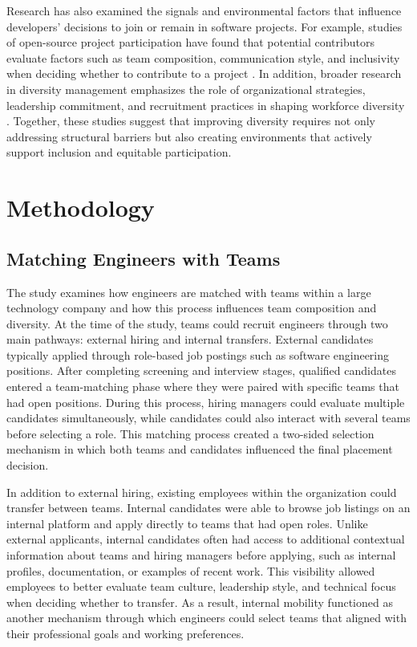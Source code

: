Research has also examined the signals and environmental factors that influence developers' decisions to join or remain in software projects. For example, studies of open-source project participation have found that potential contributors evaluate factors such as team composition, communication style, and inclusivity when deciding whether to contribute to a project \cite{qiu2019signals}. In addition, broader research in diversity management emphasizes the role of organizational strategies, leadership commitment, and recruitment practices in shaping workforce diversity \cite{kreitz2008best}. Together, these studies suggest that improving diversity requires not only addressing structural barriers but also creating environments that actively support inclusion and equitable participation.

\section{Methodology}

\subsection{Matching Engineers with Teams}
The study examines how engineers are matched with teams within a large technology company and how this process influences team composition and diversity. At the time of the study, teams could recruit engineers through two main pathways: external hiring and internal transfers. External candidates typically applied through role-based job postings such as software engineering positions. After completing screening and interview stages, qualified candidates entered a team-matching phase where they were paired with specific teams that had open positions. During this process, hiring managers could evaluate multiple candidates simultaneously, while candidates could also interact with several teams before selecting a role. This matching process created a two-sided selection mechanism in which both teams and candidates influenced the final placement decision.

In addition to external hiring, existing employees within the organization could transfer between teams. Internal candidates were able to browse job listings on an internal platform and apply directly to teams that had open roles. Unlike external applicants, internal candidates often had access to additional contextual information about teams and hiring managers before applying, such as internal profiles, documentation, or examples of recent work. This visibility allowed employees to better evaluate team culture, leadership style, and technical focus when deciding whether to transfer. As a result, internal mobility functioned as another mechanism through which engineers could select teams that aligned with their professional goals and working preferences.

